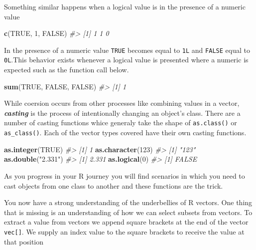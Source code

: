 \documentclass[
]{book}
\newenvironment{Shaded}{\begin{snugshade}}{\end{snugshade}}
\newcommand{\CommentTok}[1]{\textcolor[rgb]{0.56,0.35,0.01}{\textit{#1}}}
\newcommand{\DecValTok}[1]{\textcolor[rgb]{0.00,0.00,0.81}{#1}}
\newcommand{\KeywordTok}[1]{\textcolor[rgb]{0.13,0.29,0.53}{\textbf{#1}}}
\newcommand{\NormalTok}[1]{#1}
\newcommand{\OtherTok}[1]{\textcolor[rgb]{0.56,0.35,0.01}{#1}}
\newcommand{\StringTok}[1]{\textcolor[rgb]{0.31,0.60,0.02}{#1}}
\begin{document}
Something similar happens when a logical value is in the presence of a numeric value

\begin{Shaded}
\begin{Highlighting}[]
\KeywordTok{c}\NormalTok{(}\OtherTok{TRUE}\NormalTok{, }\DecValTok{1}\NormalTok{, }\OtherTok{FALSE}\NormalTok{)}
\CommentTok{\#\textgreater{} [1] 1 1 0}
\end{Highlighting}
\end{Shaded}

In the presence of a numeric value \texttt{TRUE} becomes equal to \texttt{1L} and \texttt{FALSE} equal to \texttt{0L}.This behavior exists whenever a logical value is presented where a numeric is expected such as the function call below.

\begin{Shaded}
\begin{Highlighting}[]
\KeywordTok{sum}\NormalTok{(}\OtherTok{TRUE}\NormalTok{, }\OtherTok{FALSE}\NormalTok{, }\OtherTok{FALSE}\NormalTok{)}
\CommentTok{\#\textgreater{} [1] 1}
\end{Highlighting}
\end{Shaded}

While coersion occurs from other processes like combining values in a vector, \emph{\textbf{casting}} is the process of intentionally changing an object's class. There are a number of casting functions whice generaly take the shape of \texttt{as.class()} or \texttt{as\_class()}. Each of the vector types covered have their own casting functions.

\begin{Shaded}
\begin{Highlighting}[]
\KeywordTok{as.integer}\NormalTok{(}\OtherTok{TRUE}\NormalTok{)}
\CommentTok{\#\textgreater{} [1] 1}
\KeywordTok{as.character}\NormalTok{(}\DecValTok{123}\NormalTok{)}
\CommentTok{\#\textgreater{} [1] "123"}
\KeywordTok{as.double}\NormalTok{(}\StringTok{"2.331"}\NormalTok{)}
\CommentTok{\#\textgreater{} [1] 2.331}
\KeywordTok{as.logical}\NormalTok{(}\DecValTok{0}\NormalTok{)}
\CommentTok{\#\textgreater{} [1] FALSE}
\end{Highlighting}
\end{Shaded}

As you progress in your R journey you will find scenarios in which you need to cast objects from one class to another and these functions are the trick.

You now have a strong understanding of the underbellies of R vectors. One thing that is missing is an understanding of how we can select subsets from vectors. To extract a value from vectors we append square brackets at the end of the vector \texttt{vec{[}{]}}. We supply an index value to the square brackets to receive the value at that position
\end{document}
